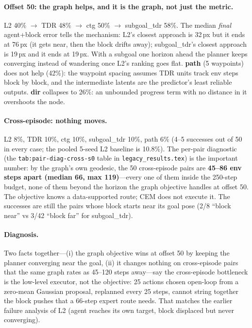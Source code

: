 \documentclass[11pt]{article}
\begin{document}
\paragraph{Offset 50: the graph helps, and it is the graph, not just the metric.}
L2 40\% $\to$ TDR 48\% $\to$ ctg 50\% $\to$ subgoal\_tdr 58\%. The median \emph{final}
agent+block error tells the mechanism: L2's closest approach is 32\,px but it ends at 76\,px
(it gets near, then the block drifts away); subgoal\_tdr's closest approach is 19\,px and it
ends at 19\,px. With a subgoal one horizon ahead the planner keeps converging instead of
wandering once L2's ranking goes flat. \textbf{path} (5 waypoints) does not help (42\%): the
waypoint spacing assumes TDR units track env steps block by block, and the intermediate
latents are the predictor's least reliable outputs. \textbf{dir} collapses to 26\%: an
unbounded progress term with no distance in it overshoots the node.

\paragraph{Cross-episode: nothing moves.} L2 8\%, TDR 10\%, ctg 10\%, subgoal\_tdr 10\%,
path 6\% (4--5 successes out of 50 in every case; the pooled 5-seed L2 baseline is 10.8\%).
The per-pair diagnostic (the \texttt{tab:pair-diag-cross-s0} table in \texttt{legacy\_results.tex}) is the important number: by the
graph's own geodesic, the 50 cross-episode pairs are \textbf{45--86 env steps apart (median
66, max 119)}---every one of them inside the 250-step budget, none of them beyond the
horizon the graph objective handles at offset 50. The objective knows a data-supported route;
CEM does not execute it. The successes are still the pairs whose block starts near its goal
pose (2/8 ``block near'' vs 3/42 ``block far'' for subgoal\_tdr).

\paragraph{Diagnosis.} Two facts together---(i) the graph objective wins at offset 50 by
keeping the planner converging near the goal, (ii) it changes nothing on cross-episode pairs
that the same graph rates as 45--120 steps away---say the cross-episode bottleneck is the
low-level executor, not the objective: 25 actions chosen open-loop from a zero-mean Gaussian
proposal, replanned every 25 steps, cannot string together the block pushes that a 66-step
expert route needs. That matches the earlier failure analysis of L2 (agent reaches its own
target, block displaced but never converging).
\end{document}
